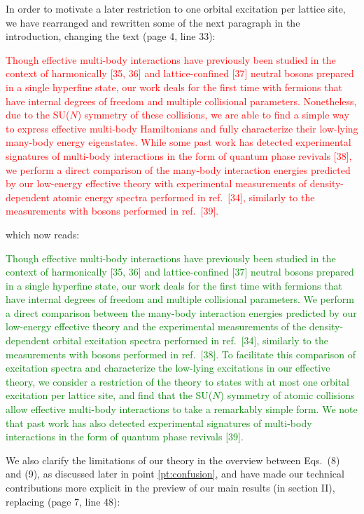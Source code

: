 \documentclass[preprint]{revtex4-1}
\newcommand{\1}{\mathds{1}}
\newcommand{\red}[1]{\textcolor{red}{#1}}
\newcommand{\green}[1]{\textcolor{green}{#1}}
\begin{document}
\begin{enumerate}
  In order to motivate a later restriction to one orbital excitation
  per lattice site, we have rearranged and rewritten some of the next
  paragraph in the introduction, changing the text (page 4, line 33):

  \red{Though effective multi-body interactions have previously been
    studied in the context of harmonically [35, 36] and
    lattice-confined [37] neutral bosons prepared in a single
    hyperfine state, our work deals for the first time with fermions
    that have internal degrees of freedom and multiple collisional
    parameters.  Nonetheless, due to the SU($N$) symmetry of these
    collisions, we are able to find a simple way to express effective
    multi-body Hamiltonians and fully characterize their low-lying
    many-body energy eigenstates.  While some past work has detected
    experimental signatures of multi-body interactions in the form of
    quantum phase revivals [38], we perform a direct comparison of the
    many-body interaction energies predicted by our low-energy
    effective theory with experimental measurements of
    density-dependent atomic energy spectra performed in ref.~[34],
    similarly to the measurements with bosons performed in ref.~[39].}

  which now reads:

  \green{Though effective multi-body interactions have previously been
    studied in the context of harmonically [35, 36] and
    lattice-confined [37] neutral bosons prepared in a single
    hyperfine state, our work deals for the first time with fermions
    that have internal degrees of freedom and multiple collisional
    parameters. We perform a direct comparison between the many-body
    interaction energies predicted by our low-energy effective theory
    and the experimental measurements of the density-dependent orbital
    excitation spectra performed in ref.~[34], similarly to the
    measurements with bosons performed in ref.~[38].  To facilitate
    this comparison of excitation spectra and characterize the
    low-lying excitations in our effective theory, we consider a
    restriction of the theory to states with at most one orbital
    excitation per lattice site, and find that the SU($N$) symmetry of
    atomic collisions allow effective multi-body interactions to take
    a remarkably simple form. We note that past work has also detected
    experimental signatures of multi-body interactions in the form of
    quantum phase revivals [39].}

  We also clarify the limitations of our theory in the overview
  between Eqs.~(8) and (9), as discussed later in point
  \ref{pt:confusion}, and have made our technical contributions more
  explicit in the preview of our main results (in section II),
  replacing (page 7, line 48):


\end{enumerate}
\end{document}
